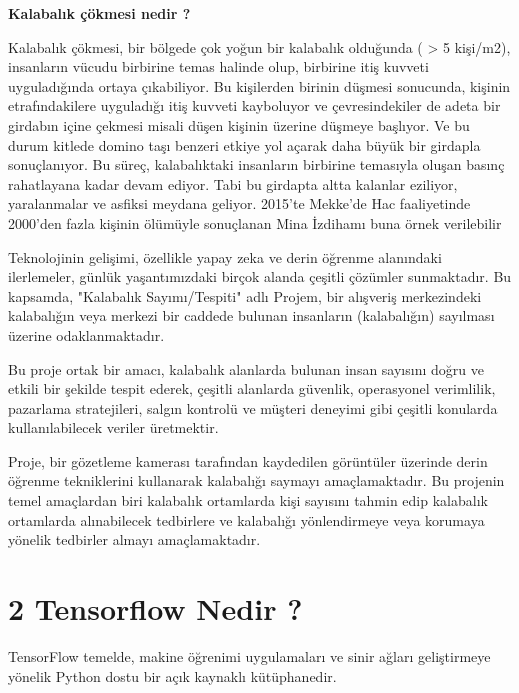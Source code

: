 \documentclass[10pt,a4paper]{report}
\begin{document}
	\textbf{Kalabalık çökmesi nedir ?}
	\raggedright Kalabalık çökmesi, bir bölgede çok yoğun bir kalabalık olduğunda ( > 5 kişi/m2), insanların vücudu birbirine temas halinde olup, birbirine itiş kuvveti uyguladığında ortaya çıkabiliyor. Bu kişilerden birinin düşmesi sonucunda, kişinin etrafındakilere uyguladığı itiş kuvveti kayboluyor ve çevresindekiler de adeta bir girdabın içine çekmesi misali düşen kişinin üzerine düşmeye başlıyor. Ve bu durum kitlede domino taşı benzeri etkiye yol açarak daha büyük bir girdapla sonuçlanıyor. Bu süreç, kalabalıktaki insanların birbirine temasıyla oluşan basınç rahatlayana kadar devam ediyor. Tabi bu girdapta altta kalanlar eziliyor, yaralanmalar ve asfiksi meydana geliyor. 2015’te Mekke’de Hac faaliyetinde 2000’den fazla kişinin ölümüyle sonuçlanan Mina İzdihamı buna örnek verilebilir\newline
	
	Teknolojinin gelişimi, özellikle yapay zeka ve derin öğrenme alanındaki ilerlemeler, günlük yaşantımızdaki birçok alanda çeşitli çözümler sunmaktadır. Bu kapsamda, "Kalabalık Sayımı/Tespiti" adlı Projem, bir alışveriş merkezindeki kalabalığın veya merkezi bir caddede bulunan insanların (kalabalığın) sayılması üzerine odaklanmaktadır.\newline
	
	
	
	Bu proje ortak bir amacı, kalabalık alanlarda bulunan insan sayısını doğru ve etkili bir şekilde tespit ederek, çeşitli alanlarda güvenlik, operasyonel verimlilik, pazarlama stratejileri, salgın kontrolü ve müşteri deneyimi gibi çeşitli konularda kullanılabilecek veriler üretmektir.\newline
	
	\clearpage
	
	Proje, bir gözetleme kamerası tarafından kaydedilen görüntüler üzerinde derin öğrenme tekniklerini kullanarak kalabalığı saymayı amaçlamaktadır.
	Bu projenin temel amaçlardan biri kalabalık ortamlarda kişi sayısını tahmin edip kalabalık ortamlarda alınabilecek tedbirlere ve kalabalığı yönlendirmeye veya korumaya yönelik tedbirler almayı amaçlamaktadır.\newline
	
	
	
	
	\section*{2 Tensorflow Nedir ? }
	
	TensorFlow temelde, makine öğrenimi uygulamaları ve sinir ağları geliştirmeye yönelik Python dostu bir açık kaynaklı kütüphanedir.
	
\end{document}
